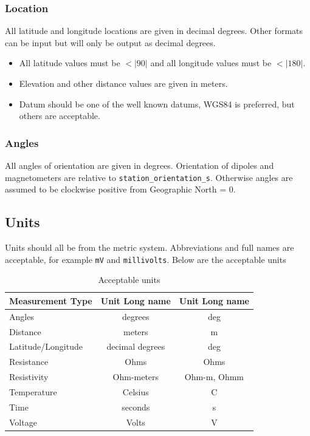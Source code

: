 \documentclass{article}
\begin{document}
\subsubsection{Location}

All latitude and longitude locations are given in decimal degrees. Other formats can be input but will only be output as decimal degrees.

\begin{itemize}
	\setlength\itemsep{0em}
	\item All latitude values must be $<|90|$ and all longitude values must be $<|180|$.
	\item Elevation and other distance values are given in meters.
	\item Datum should be one of the well known datums, WGS84 is preferred, but others are acceptable.
\end{itemize} 

\subsubsection{Angles}

All angles of orientation are given in degrees.  Orientation of dipoles and magnetometers are relative to \verb|station_orientation_s|.  Otherwise angles are assumed to be clockwise positive from Geographic North = 0.  

\subsection{Units}
Units should all be from the metric system.  Abbreviations and full names are acceptable, for example \verb|mV| and \verb|millivolts|.  Below are the acceptable units


\begin{table}[htb!]
	\centering
	\caption[Acceptable units]{Acceptable units}
	\begin{tabular}{|l|c|c|}
		\hline
		\textbf{Measurement Type} & \textbf{Unit Long name}  & \textbf{Unit Long name} \\ \hline
		Angles & degrees & deg \\ \hline
		
		Distance &  meters & m \\ \hline
		Latitude/Longitude & decimal degrees & deg \\ \hline
		Resistance & Ohms  &  Ohms \\ \hline
		Resistivity & Ohm-meters & Ohm-m, Ohmm \\ \hline
		Temperature & Celsius & C \\ \hline
		Time &  seconds & s \\ \hline
		Voltage & Volts & V \\ \hline
		
		
	\end{tabular}
	\label{tab:units}
\end{table}
\end{document}
